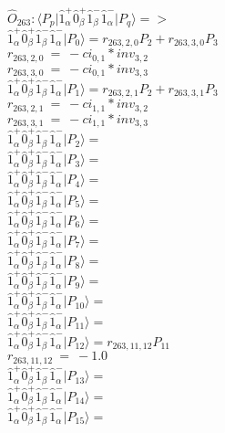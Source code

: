 \documentclass[14pt]{article}
\begin{document}
    $\hat{O}_{263}:  \langle{P_p}\vert \hat{1}_{\alpha}^{+}\hat{0}_{\beta}^{+}\hat{1}_{\beta}^{-}\hat{1}_{\alpha}^{-} \vert{P_q}\rangle => $ \\ 
    $ \hat{1}_{\alpha}^{+}\hat{0}_{\beta}^{+}\hat{1}_{\beta}^{-}\hat{1}_{\alpha}^{-} \vert{P_{0}}\rangle = {r}_{263,2,0}P_{2}+{r}_{263,3,0}P_{3} $ \\ 
    ${r}_{263,2,0}\ =\ -{ci}_{0,1}*{inv}_{3,2} $ \\ 
    ${r}_{263,3,0}\ =\ -{ci}_{0,1}*{inv}_{3,3} $ \\ 
    $ \hat{1}_{\alpha}^{+}\hat{0}_{\beta}^{+}\hat{1}_{\beta}^{-}\hat{1}_{\alpha}^{-} \vert{P_{1}}\rangle = {r}_{263,2,1}P_{2}+{r}_{263,3,1}P_{3} $ \\ 
    ${r}_{263,2,1}\ =\ -{ci}_{1,1}*{inv}_{3,2} $ \\ 
    ${r}_{263,3,1}\ =\ -{ci}_{1,1}*{inv}_{3,3} $ \\ 
    $ \hat{1}_{\alpha}^{+}\hat{0}_{\beta}^{+}\hat{1}_{\beta}^{-}\hat{1}_{\alpha}^{-} \vert{P_{2}}\rangle =  $ \\ 
    $ \hat{1}_{\alpha}^{+}\hat{0}_{\beta}^{+}\hat{1}_{\beta}^{-}\hat{1}_{\alpha}^{-} \vert{P_{3}}\rangle =  $ \\ 
    $ \hat{1}_{\alpha}^{+}\hat{0}_{\beta}^{+}\hat{1}_{\beta}^{-}\hat{1}_{\alpha}^{-} \vert{P_{4}}\rangle =  $ \\ 
    $ \hat{1}_{\alpha}^{+}\hat{0}_{\beta}^{+}\hat{1}_{\beta}^{-}\hat{1}_{\alpha}^{-} \vert{P_{5}}\rangle =  $ \\ 
    $ \hat{1}_{\alpha}^{+}\hat{0}_{\beta}^{+}\hat{1}_{\beta}^{-}\hat{1}_{\alpha}^{-} \vert{P_{6}}\rangle =  $ \\ 
    $ \hat{1}_{\alpha}^{+}\hat{0}_{\beta}^{+}\hat{1}_{\beta}^{-}\hat{1}_{\alpha}^{-} \vert{P_{7}}\rangle =  $ \\ 
    $ \hat{1}_{\alpha}^{+}\hat{0}_{\beta}^{+}\hat{1}_{\beta}^{-}\hat{1}_{\alpha}^{-} \vert{P_{8}}\rangle =  $ \\ 
    $ \hat{1}_{\alpha}^{+}\hat{0}_{\beta}^{+}\hat{1}_{\beta}^{-}\hat{1}_{\alpha}^{-} \vert{P_{9}}\rangle =  $ \\ 
    $ \hat{1}_{\alpha}^{+}\hat{0}_{\beta}^{+}\hat{1}_{\beta}^{-}\hat{1}_{\alpha}^{-} \vert{P_{10}}\rangle =  $ \\ 
    $ \hat{1}_{\alpha}^{+}\hat{0}_{\beta}^{+}\hat{1}_{\beta}^{-}\hat{1}_{\alpha}^{-} \vert{P_{11}}\rangle =  $ \\ 
    $ \hat{1}_{\alpha}^{+}\hat{0}_{\beta}^{+}\hat{1}_{\beta}^{-}\hat{1}_{\alpha}^{-} \vert{P_{12}}\rangle = {r}_{263,11,12}P_{11} $ \\ 
    ${r}_{263,11,12}\ =\ -1.0 $ \\ 
    $ \hat{1}_{\alpha}^{+}\hat{0}_{\beta}^{+}\hat{1}_{\beta}^{-}\hat{1}_{\alpha}^{-} \vert{P_{13}}\rangle =  $ \\ 
    $ \hat{1}_{\alpha}^{+}\hat{0}_{\beta}^{+}\hat{1}_{\beta}^{-}\hat{1}_{\alpha}^{-} \vert{P_{14}}\rangle =  $ \\ 
    $ \hat{1}_{\alpha}^{+}\hat{0}_{\beta}^{+}\hat{1}_{\beta}^{-}\hat{1}_{\alpha}^{-} \vert{P_{15}}\rangle =  $ \\ 
    
\end{document}
